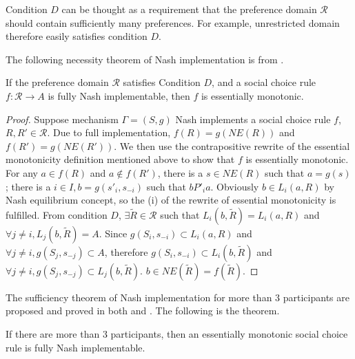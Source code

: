Condition $D$ can be thought as a requirement that the preference
domain $\mathscr{R}$ should contain sufficiently many
preferences. For example, unrestricted domain therefore easily
satisfies condition $D$.

The following necessity theorem of Nash implementation is
from \parencite{Yamato1992}.

\begin{thm}
If the preference domain $\mathscr{R}$ satisfies Condition $D$, and
a social choice rule $f :\mathscr{R} \rightarrow A$ is fully Nash
implementable, then $f$ is essentially monotonic.

\end{thm}

\begin{proof}
Suppose mechanism $\Gamma=(S,g)$ Nash implements a  social choice rule
$f$, $R, R' \in \mathscr{R}$. Due to full implementation, $f(R)=
g(NE(R))$ and $f(R')= g(NE(R'))$. We then use  the contrapositive rewrite of
the essential monotonicity definition mentioned above to show that $f$
is essentially monotonic. For any $a \in f(R)$ and $a \not \in f(R')$,
there is a $ s \in NE(R)$ such that $a =g(s)$ ; there is a $i \in I, b
= g(s'_i, s_{-i})$ such that  $ b P'_i a$. Obviously  $b \in L_i(a,
R)$ by Nash equilibrium concept, so the (i) of the rewrite
of essential monotonicity is fulfilled. From condition $D$, $\exists
\tilde{R} \in \mathscr{R}$ such that $L_i(b, \tilde{R})=L_i(a,R)$
and $\forall j \not = i, L_j(b, \tilde{R})=A$. Since $g(S_i, s_{-i})
\subset L_i(a,R) $ and $\forall j\not = i, g(S_j, s_{-j}) \subset A$, therefore $g(S_i, s_{-i})
\subset L_i(b, \tilde{R}) $ and $\forall j \not = i, g(S_j, s_{-j})
\subset L_j(b, \tilde{R})$. $b \in NE(\tilde{R}) = f(\tilde{R})$.
\end{proof}

The sufficiency theorem of Nash implementation for more than 3
participants are proposed and proved in both \parencite{Danilov1992}
and \parencite{Yamato1992}. The following is the theorem.

\begin{thm}
If there are more than 3 participants, then an essentially monotonic
social choice rule  is fully Nash implementable.
\end{thm}

